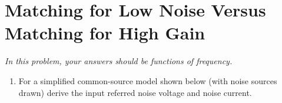 \section{Matching for Low Noise Versus Matching for High Gain}
\emph{In this problem, your answers should be functions of frequency.}

\begin{enumerate}[label=(\alph*)]
    \item {\color{blue} For a simplified common-source model shown below (with noise sources drawn) derive the input referred noise voltage and noise current.}
\end{enumerate}


